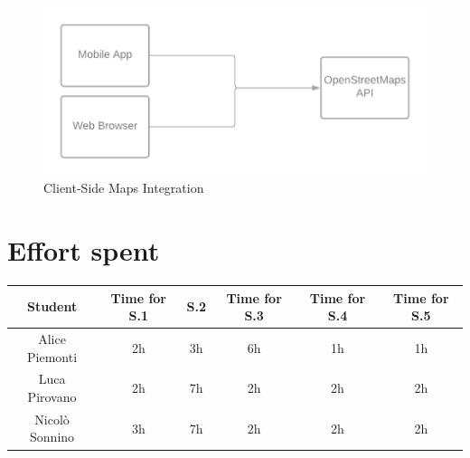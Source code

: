\documentclass[table, 12pt]{article}
\begin{document}
\begin{center}
    \begin{figure}[H]
        \includegraphics[width=\textwidth]{assets/IT-Plan/OpenStreetMaps.png}
        \caption{Client-Side Maps Integration}\label{maps_api}
    \end{figure}
\end{center}


\pagestyle{plain}

\section{Effort spent}
\begin{tabular}{ | c || c | c | c | c| c|}
    \hline
    Student        & Time for S.1 & S.2 & Time for S.3 & Time for S.4 & Time for S.5 \\ \hline
    Alice Piemonti & 2h           & 3h  & 6h           & 1h           & 1h           \\ \hline
    Luca Pirovano  & 2h           & 7h  & 2h           & 2h           & 2h           \\ \hline
    Nicolò Sonnino & 3h           & 7h  & 2h           & 2h           & 2h           \\
    \hline
\end{tabular}
\end{document}
